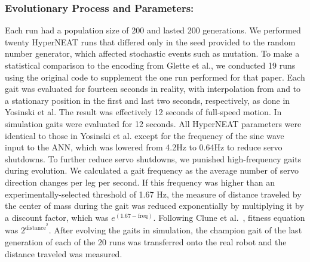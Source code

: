 
\subsubsection{Evolutionary Process and Parameters:}

Each run had a population size of 200 and lasted 200 generations. We performed twenty HyperNEAT runs that differed only in the seed provided to the random number generator, which affected stochastic events such as mutation. To make a statistical comparison to the encoding from Glette et al., we conducted 19 runs using the original code to supplement the one run performed for that paper. 
Each gait was evaluated for fourteen seconds in reality, with interpolation from and to a stationary position in the first and last two seconds, respectively, as done in Yosinski et al. The result was effectively 12 seconds of full-speed
motion. In simulation gaits were evaluated for 12 seconds. 
All HyperNEAT parameters were identical to those in Yosinski et al. except for the frequency of the sine wave input to the ANN, which was lowered from 4.2Hz to 0.64Hz to reduce servo shutdowns. 
To further reduce servo shutdowns, we punished high-frequency gaits during evolution. We calculated a gait frequency as the average number of servo direction changes per leg per second. If this frequency was higher than an experimentally-selected threshold of 1.67 Hz, the measure of distance traveled by the center of mass during the gait was reduced exponentially by multiplying it by a discount factor, which was $e^{(1.67-\mathrm{freq})}$. Following Clune et al.~\cite{clune2009evolving}, fitness equation was $2^{\mathrm{distance}^{2}}$. After evolving the gaits in simulation, the champion gait of the last generation of each of the 20 runs was transferred onto the real robot and the distance traveled was measured. 

